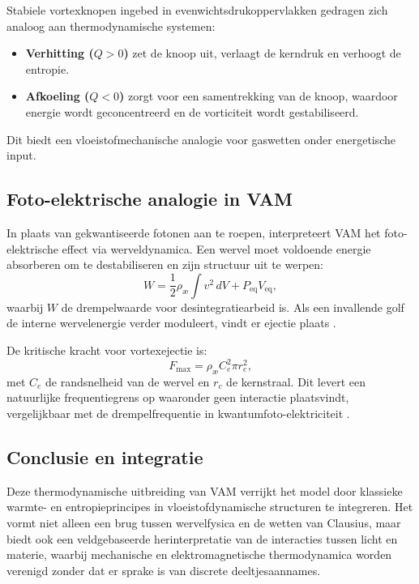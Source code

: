 Stabiele vortexknopen ingebed in evenwichtsdrukoppervlakken gedragen zich analoog aan thermodynamische systemen:
\begin{itemize}
\item \textbf{Verhitting ($Q > 0$)} zet de knoop uit, verlaagt de kerndruk en verhoogt de entropie. \item \textbf{Afkoeling ($Q < 0$)} zorgt voor een samentrekking van de knoop, waardoor energie wordt geconcentreerd en de vorticiteit wordt gestabiliseerd.
\end{itemize}
Dit biedt een vloeistofmechanische analogie voor gaswetten onder energetische input.

\subsection{Foto-elektrische analogie in VAM}

In plaats van gekwantiseerde fotonen aan te roepen, interpreteert VAM het foto-elektrische effect via werveldynamica. Een wervel moet voldoende energie absorberen om te destabiliseren en zijn structuur uit te werpen:
\begin{equation}
W = \frac{1}{2} \rho_{\text{\ae}} \int v^2 \, dV + P_{\text{eq}} V_{\text{eq}},\label{eq:foto-elektrische_arbeid}
\end{equation}
waarbij $W$ de drempelwaarde voor desintegratiearbeid is. Als een invallende golf de interne wervelenergie verder moduleert, vindt er ejectie plaats \cite{vam2025unified}.

De kritische kracht voor vortexejectie is:
\begin{equation}
F_{\max} = \rho_{\text{\ae}} C_e^2 \pi r_c^2,\label{eq:critical_force}
\end{equation}
met $C_e$ de randsnelheid van de wervel en $r_c$ de kernstraal. Dit levert een natuurlijke frequentiegrens op waaronder geen interactie plaatsvindt, vergelijkbaar met de drempelfrequentie in kwantumfoto-elektriciteit \cite{einstein1905photoelectric}.

\subsection*{Conclusie en integratie}

Deze thermodynamische uitbreiding van VAM verrijkt het model door klassieke warmte- en entropieprincipes in vloeistofdynamische structuren te integreren. Het vormt niet alleen een brug tussen wervelfysica en de wetten van Clausius, maar biedt ook een veldgebaseerde herinterpretatie van de interacties tussen licht en materie, waarbij mechanische en elektromagnetische thermodynamica worden verenigd zonder dat er sprake is van discrete deeltjesaannames.